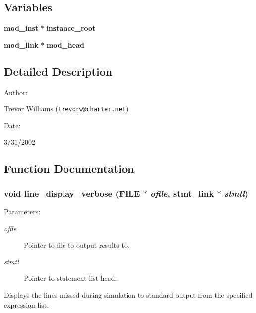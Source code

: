 \subsection*{Variables}
\begin{CompactItemize}
\item 
{\bf mod\_\-inst} $\ast$ {\bf instance\_\-root}
\item 
{\bf mod\_\-link} $\ast$ {\bf mod\_\-head}
\end{CompactItemize}


\subsection{Detailed Description}


\begin{Desc}
\item[Author: ]\par
Trevor Williams ({\tt trevorw@charter.net}) \end{Desc}
\begin{Desc}
\item[Date: ]\par
3/31/2002\end{Desc}


\subsection{Function Documentation}
\subsubsection{\setlength{\rightskip}{0pt plus 5cm}void line\_\-display\_\-verbose (FILE $\ast$ {\em ofile}, {\bf stmt\_\-link} $\ast$ {\em stmtl})}\label{line_8c_a5}


\begin{Desc}
\item[Parameters: ]\par
\begin{description}
\item[{\em 
ofile}]Pointer to file to output results to. \item[{\em 
stmtl}]Pointer to statement list head.\end{description}
\end{Desc}
Displays the lines missed during simulation to standard output from the specified expression list. 
